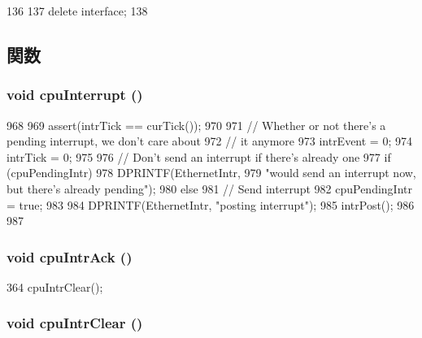 \begin{DoxyCode}
136 {
137     delete interface;
138 }
\end{DoxyCode}


\subsection{関数}
\hypertarget{classNSGigE_a6191ac616bb71f81aeb9a72898f5207f}{
\subsubsection[{cpuInterrupt}]{\setlength{\rightskip}{0pt plus 5cm}void cpuInterrupt ()}}
\label{classNSGigE_a6191ac616bb71f81aeb9a72898f5207f}



\begin{DoxyCode}
968 {
969     assert(intrTick == curTick());
970 
971     // Whether or not there's a pending interrupt, we don't care about
972     // it anymore
973     intrEvent = 0;
974     intrTick = 0;
975 
976     // Don't send an interrupt if there's already one
977     if (cpuPendingIntr) {
978         DPRINTF(EthernetIntr,
979                 "would send an interrupt now, but there's already pending\n");
980     } else {
981         // Send interrupt
982         cpuPendingIntr = true;
983 
984         DPRINTF(EthernetIntr, "posting interrupt\n");
985         intrPost();
986     }
987 }
\end{DoxyCode}
\hypertarget{classNSGigE_aa1dc801f063bc87ddb1cf8c618ec692e}{
\subsubsection[{cpuIntrAck}]{\setlength{\rightskip}{0pt plus 5cm}void cpuIntrAck ()}}
\label{classNSGigE_aa1dc801f063bc87ddb1cf8c618ec692e}



\begin{DoxyCode}
364 { cpuIntrClear(); }
\end{DoxyCode}
\hypertarget{classNSGigE_ab1873826f52c78bed89f2ee53382a4c2}{
\subsubsection[{cpuIntrClear}]{\setlength{\rightskip}{0pt plus 5cm}void cpuIntrClear ()}}
\label{classNSGigE_ab1873826f52c78bed89f2ee53382a4c2}



